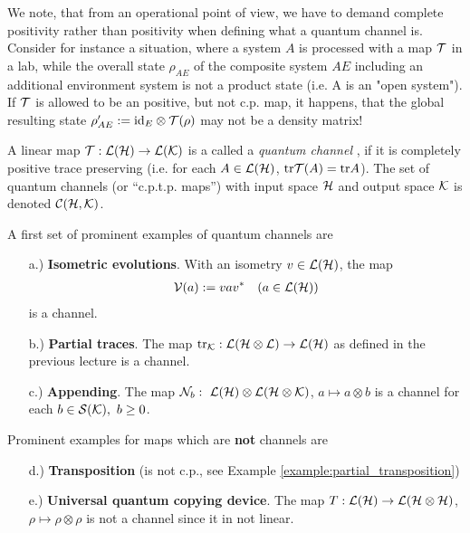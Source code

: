 We note, that from an operational point of view, we have to demand complete positivity rather than positivity when defining what a quantum channel is. Consider for instance a situation, where a system $A$ is processed with a map ${\mathcal T}$ in a lab, while the overall state $\rho_{AE}$ of the composite system $AE$ including an additional environment system is not a product state (i.e. A is an "open system"). If ${\mathcal T}$ is allowed to be an positive, but not c.p. map, it happens, that the global resulting state 
$\rho'_{AE} := \mathrm{id}_E \otimes {\mathcal T}(\rho)$ may not be a density matrix! 
\begin{definition}   \label{def:quantum_channel}
A linear map ${\mathcal T}: {\mathcal L}({\mathcal H}) \rightarrow {\mathcal L}({\mathcal K})$ is a called a \emph{quantum channel}  , if it is 
completely positive trace preserving (i.e. for each $A \in {\mathcal L}({\mathcal H})$, $\mathrm{tr} {\mathcal T}(A) = \mathrm{tr} A$).
 The set of quantum channels (or ``c.p.t.p. maps'') with input space ${\mathcal H}$ and output space ${\mathcal K}$ is denoted ${\mathcal C}({\mathcal H}, {\mathcal K})$.
\end{definition}
A first set of prominent examples of quantum channels are 
\begin{enumerate}
 \item [a.)] \textbf{Isometric evolutions}. With an isometry $v \in {\mathcal L}({\mathcal H})$, the map
 \begin{align}
  {\mathcal V}(a) := v a v^\ast &&(a \in {\mathcal L}({\mathcal H}))
 \end{align} 
  is a channel. 
 \item [b.)] \textbf{Partial traces}. The map $\mathrm{tr}_{{\mathcal K}}: {\mathcal L}({\mathcal H} \otimes {\mathcal L}) \rightarrow {\mathcal L}({\mathcal H})$ as defined in the previous lecture is a channel.
 \item [c.)] \textbf{Appending}. The map ${\mathcal N}_{b}: \ {\mathcal L}({\mathcal H}) \otimes {\mathcal L}({\mathcal H} \otimes {\mathcal K})$, $a \mapsto a \otimes b$ is a channel for each $b \in {\mathcal S}({\mathcal K}), \ b \geq 0$.
\end{enumerate}
Prominent examples for maps which are \textbf{not} channels are
\begin{enumerate}
 \item [d.)] \textbf{Transposition} (is not c.p., see Example \ref{example:partial_transposition})
 \item [e.)] \textbf{Universal quantum copying device}. The map $T: {\mathcal L}({\mathcal H}) \rightarrow {\mathcal L}({\mathcal H} \otimes {\mathcal H})$, $\rho \mapsto \rho \otimes \rho$ is not a channel since it in not linear. 
\end{enumerate}
